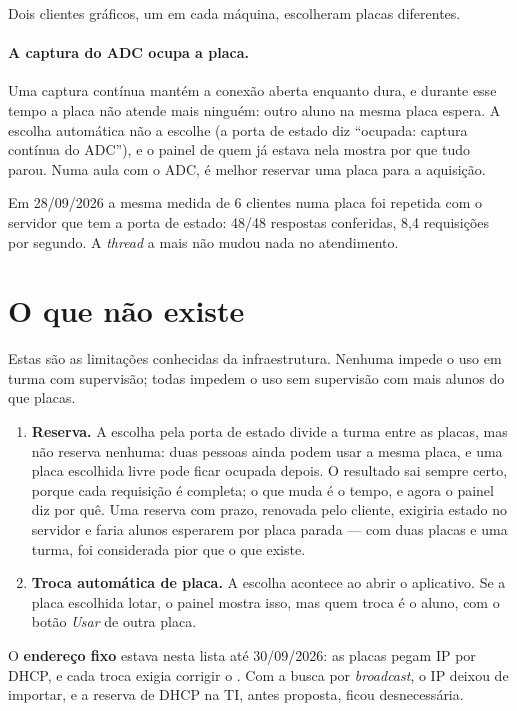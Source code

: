 Dois clientes gráficos, um em cada máquina, escolheram placas diferentes.

\paragraph{A captura do ADC ocupa a placa.} Uma captura contínua mantém a
conexão aberta enquanto dura, e durante esse tempo a placa não atende mais
ninguém: outro aluno na mesma placa espera. A escolha automática não a escolhe
(a porta de estado diz ``ocupada: captura contínua do ADC''), e o painel de quem
já estava nela mostra por que tudo parou. Numa aula com o ADC, é melhor reservar
uma placa para a aquisição.

Em 28/09/2026 a mesma medida de 6 clientes numa placa foi repetida com o
servidor que tem a porta de estado: 48/48 respostas conferidas, 8,4 requisições
por segundo. A \emph{thread} a mais não mudou nada no atendimento.

\section{O que não existe}

Estas são as limitações conhecidas da infraestrutura. Nenhuma impede o uso em
turma com supervisão; todas impedem o uso sem supervisão com mais alunos do que
placas.

\begin{enumerate}
  \item \textbf{Reserva.} A escolha pela porta de estado divide a turma entre
    as placas, mas não reserva nenhuma: duas pessoas ainda podem usar a mesma
    placa, e uma placa escolhida livre pode ficar ocupada depois. O resultado
    sai sempre certo, porque cada requisição é completa; o que muda é o tempo,
    e agora o painel diz por quê. Uma reserva com prazo, renovada pelo cliente,
    exigiria estado no servidor e faria alunos esperarem por placa parada ---
    com duas placas e uma turma, foi considerada pior que o que existe.
  \item \textbf{Troca automática de placa.} A escolha acontece ao abrir o
    aplicativo. Se a placa escolhida lotar, o painel mostra isso, mas quem
    troca é o aluno, com o botão \emph{Usar} de outra placa.
\end{enumerate}

O \textbf{endereço fixo} estava nesta lista até 30/09/2026: as placas pegam IP
por DHCP, e cada troca exigia corrigir o . Com a busca por
\emph{broadcast}, o IP deixou de importar, e a reserva de DHCP na TI, antes
proposta, ficou desnecessária.

